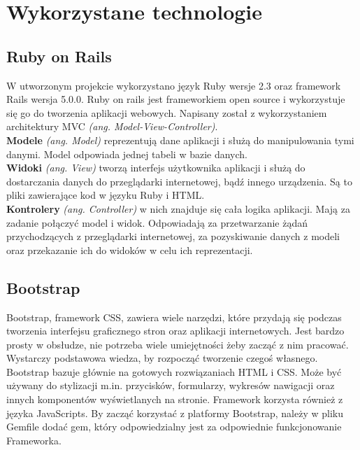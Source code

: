 \documentclass[openright]{xmgr}
\begin{document}
	\chapter{Wykorzystane technologie}
	
	\section{Ruby on Rails}
	
	W utworzonym projekcie wykorzystano język Ruby wersje 2.3 oraz framework Rails wersja 5.0.0. Ruby on rails jest frameworkiem open source i wykorzystuje się go do tworzenia aplikacji webowych. Napisany został z wykorzystaniem architektury MVC \emph{(ang. Model-View-Controller)}.\\
	
	\textbf{Modele} \emph{(ang. Model)} reprezentują dane aplikacji i służą do manipulowania tymi danymi. Model odpowiada jednej tabeli w bazie danych.\\
	
	
	\textbf{Widoki} \emph{(ang. View)} tworzą interfejs użytkownika aplikacji i służą do dostarczania danych do przeglądarki internetowej, bądź innego urządzenia. Są to pliki zawierające kod w języku Ruby i HTML.\\
	
	\textbf{Kontrolery} \emph{(ang. Controller)} w nich znajduje się cała logika aplikacji. Mają za zadanie połączyć model i widok. Odpowiadają za przetwarzanie żądań przychodzących z przeglądarki internetowej, za pozyskiwanie danych z modeli oraz przekazanie ich do widoków w celu ich reprezentacji.

	
	\section{Bootstrap}
	
	Bootstrap, framework CSS, zawiera wiele narzędzi, które przydają się podczas tworzenia interfejsu graficznego stron oraz aplikacji internetowych. Jest bardzo prosty w obsłudze, nie potrzeba wiele umiejętności żeby zacząć z nim pracować. Wystarczy podstawowa wiedza, by rozpocząć tworzenie czegoś własnego. Bootstrap bazuje głównie na gotowych rozwiązaniach HTML i CSS. Może być używany do stylizacji m.in. przycisków, formularzy, wykresów nawigacji oraz innych komponentów wyświetlanych na stronie. Framework korzysta również z języka JavaScripts. By zacząć korzystać z platformy Bootstrap, należy w pliku Gemfile dodać gem, który odpowiedzialny jest za odpowiednie funkcjonowanie Frameworka.
	
\end{document}
